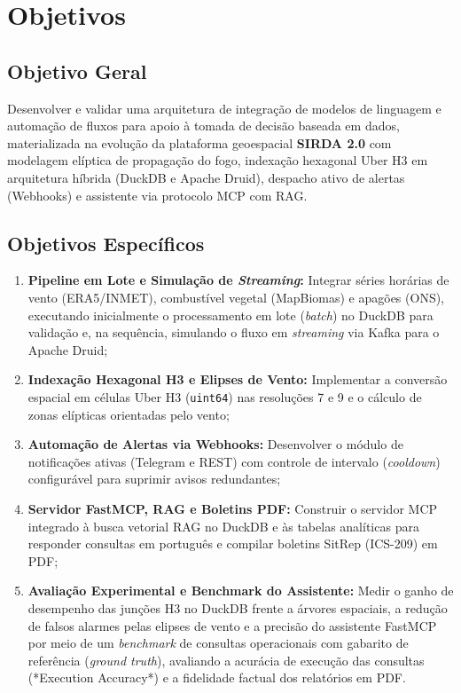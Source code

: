 \section{Objetivos}
\label{sc:objetivos}

\subsection{Objetivo Geral}
Desenvolver e validar uma arquitetura de integração de modelos de linguagem e automação de fluxos para apoio à tomada de decisão baseada em dados, materializada na evolução da plataforma geoespacial \textbf{SIRDA 2.0} com modelagem elíptica de propagação do fogo, indexação hexagonal Uber H3 em arquitetura híbrida (DuckDB e Apache Druid), despacho ativo de alertas (Webhooks) e assistente via protocolo MCP com RAG.

\subsection{Objetivos Específicos}
\begin{enumerate}
    \setlength\itemsep{0em}
    \item \textbf{Pipeline em Lote e Simulação de \textit{Streaming}:} Integrar séries horárias de vento (ERA5/INMET), combustível vegetal (MapBiomas) e apagões (ONS), executando inicialmente o processamento em lote (\textit{batch}) no DuckDB para validação e, na sequência, simulando o fluxo em \textit{streaming} via Kafka para o Apache Druid;
    \item \textbf{Indexação Hexagonal H3 e Elipses de Vento:} Implementar a conversão espacial em células Uber H3 (\texttt{uint64}) nas resoluções 7 e 9 e o cálculo de zonas elípticas orientadas pelo vento;
    \item \textbf{Automação de Alertas via Webhooks:} Desenvolver o módulo de notificações ativas (Telegram e REST) com controle de intervalo (\textit{cooldown}) configurável para suprimir avisos redundantes;
    \item \textbf{Servidor FastMCP, RAG e Boletins PDF:} Construir o servidor MCP integrado à busca vetorial RAG no DuckDB e às tabelas analíticas para responder consultas em português e compilar boletins SitRep (ICS-209) em PDF;
    \item \textbf{Avaliação Experimental e Benchmark do Assistente:} Medir o ganho de desempenho das junções H3 no DuckDB frente a árvores espaciais, a redução de falsos alarmes pelas elipses de vento e a precisão do assistente FastMCP por meio de um \textit{benchmark} de consultas operacionais com gabarito de referência (\textit{ground truth}), avaliando a acurácia de execução das consultas (*Execution Accuracy*) e a fidelidade factual dos relatórios em PDF.
\end{enumerate}
